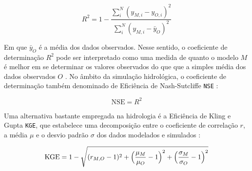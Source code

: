 \documentclass[./main.tex]{subfiles}
\begin{document}
\begin{linenomath*}
\begin{equation} 
	\label{eq:r2}
 R^2 = 1 - \frac{\sum_{i}^{N} (y_{M, i} - y_{O, i})^2}{\sum_{i}^{N} (y_{M, i} - \bar{y}_{O})^2}
\end{equation}
\end{linenomath*}
Em que $\bar{y}_{O}$ é a média dos dados observados. Nesse sentido, o coeficiente de determinação $R^2$ pode ser interpretado como uma medida de quanto o modelo $M$ é melhor em se determinar os valores observados do que que a simples média dos dados observados $O$ . No âmbito da simulação hidrológica, o coeficiente de determinação também denominado de Eficiência de Nash-Sutcliffe \texttt{NSE} \cite{Nash1970}:
\begin{linenomath*}
\begin{equation} 
	\label{eq:nse}
 \text{NSE} = R^2
\end{equation}
\end{linenomath*}
Uma alternativa bastante empregada na hidrologia é a Eficiência de Kling e Gupta \texttt{KGE}, que estabelece uma decomposição entre o coeficiente de correlação $r$, a média $\mu$ e o desvio padrão $\sigma$ dos dados modelados e simulados \cite{Gupta2009}:
\begin{linenomath*}
\begin{equation} 
	\label{eq:kge}
 \text{KGE} = 1 - \sqrt{(r_{M,O} - 1)^2 + \Big{(}\frac{\mu_M}{\mu_O} - 1\Big{)}^2 + \Big{(}\frac{\sigma_M}{\sigma_O} - 1\Big{) }^2 } 
\end{equation}
\end{linenomath*}
\end{document}
